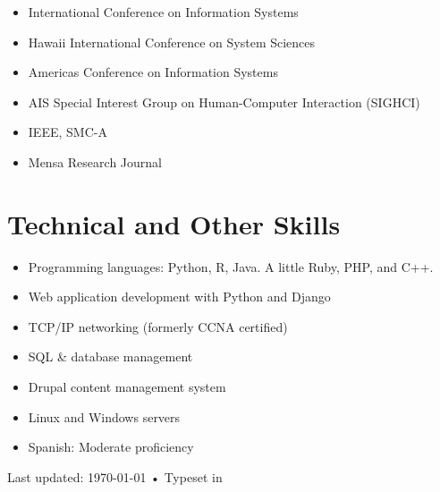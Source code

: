 \documentclass[10pt, letter]{article}
\begin{document}
\begin{itemize}
\itemsep0em
\item International Conference on Information Systems
\item Hawaii International Conference on System Sciences
\item Americas Conference on Information Systems
\item AIS Special Interest Group on Human-Computer Interaction (SIGHCI)
\item IEEE, SMC-A
\item Mensa Research Journal
\end{itemize}


\section*{Technical and Other Skills}

\begin{itemize}
\itemsep0em
\item Programming languages: Python, R, Java. A little Ruby, PHP, and C++.
\item Web application development with Python and Django
\item TCP/IP networking (formerly CCNA certified)
\item SQL \& database management
\item Drupal content management system
\item Linux and Windows servers
\item Spanish: Moderate proficiency
\end{itemize}


\vfill{}

\begin{center}
{\scriptsize  Last updated: \today\- •\- 
Typeset in \href{http://nitens.org/taraborelli/cvtex}{
\XeTeX }\\
}
\end{center}
\end{document}
